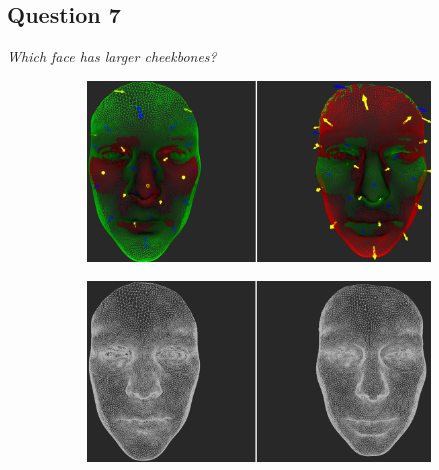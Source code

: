 \subsection{Question 7}
\label{attch:complete_study_results-question7}

\begin{center}{\it Which face has larger cheekbones?}\end{center}

\begin{figure}[h]
\centering
\begin{subfigure}{0.49\textwidth}
\includegraphics[width=\textwidth]{./img-study/pair17.PNG}
\caption{}
\label{fig:study-6-17}
\end{subfigure}
\begin{subfigure}{0.49\textwidth}
\includegraphics[width=\textwidth]{./img-study/pair15.PNG}
\caption{}
\label{fig:study-6-15}
\end{subfigure}


\end{figure}
